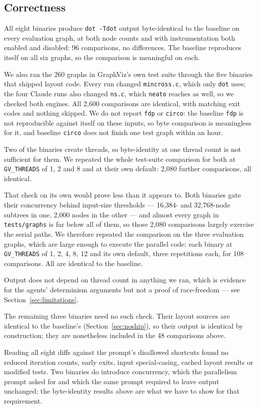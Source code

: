 \subsection{Correctness}

All eight binaries produce \texttt{dot -Tdot} output byte-identical to the
baseline on every evaluation graph, at both node counts and with instrumentation
both enabled and disabled: 96 comparisons, no differences. The baseline
reproduces itself on all six graphs, so the comparison is meaningful on each.

We also ran the 260 graphs in GraphViz's own test suite through the five
binaries that shipped layout code. Every run changed \texttt{mincross.c}, which
only \texttt{dot} uses; the four Claude runs also changed \texttt{ns.c}, which
\texttt{neato} reaches as well, so we checked both engines. All 2{,}600
comparisons are identical, with matching exit codes and nothing skipped. We do
not report \texttt{fdp} or \texttt{circo}: the baseline \texttt{fdp} is not
reproducible against itself on these inputs, so byte comparison is meaningless
for it, and baseline \texttt{circo} does not finish one test graph within an
hour.

Two of the binaries create threads, so byte-identity at one thread count is not
sufficient for them. We repeated the whole test-suite comparison for both at
\texttt{GV\_THREADS} of 1, 2 and 8 and at their own default: 2{,}080 further
comparisons, all identical.

That check on its own would prove less than it appears to. Both binaries gate
their concurrency behind input-size thresholds --- 16{,}384- and 32{,}768-node
subtrees in one, 2{,}000 nodes in the other --- and almost every graph in
\texttt{tests/graphs} is far below all of them, so those 2{,}080 comparisons
largely exercise the serial paths. We therefore repeated the comparison on the
three evaluation graphs, which are large enough to execute the parallel code:
each binary at \texttt{GV\_THREADS} of 1, 2, 4, 8, 12 and its own default, three
repetitions each, for 108 comparisons. All are identical to the baseline.

Output does not depend on thread count in anything we ran, which is evidence for
the agents' determinism arguments but not a proof of race-freedom --- see
Section~\ref{sec:limitations}.

The remaining three binaries need no such check. Their layout sources are
identical to the baseline's (Section~\ref{sec:noship}), so their output is
identical by construction; they are nonetheless included in the 48 comparisons
above.

Reading all eight diffs against the prompt's disallowed shortcuts found no
reduced iteration counts, early exits, input special-casing, cached layout
results or modified tests. Two binaries do introduce concurrency, which the
parallelism prompt asked for and which the same prompt required to leave output
unchanged; the byte-identity results above are what we have to show for that
requirement.
